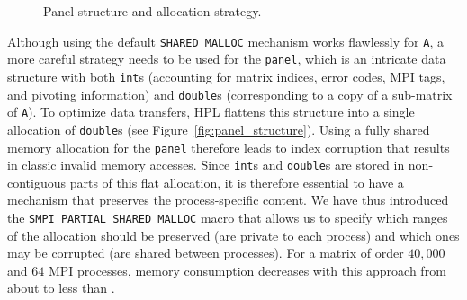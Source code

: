 \begin{figure}[htbp]
{\begin{minipage}{1.0\linewidth}
{\begin{minipage}[b]{\linewidth}
                \end{minipage}%
            }%
            \end{minipage}}%
            \caption{Panel structure and allocation strategy.\label{fig:panel}}\vspace{-1em}
        \end{figure}

        Although using the default \texttt{SHARED\_MALLOC} mechanism works flawlessly for \texttt{A}, a more careful
        strategy needs to be used for the \texttt{panel}, which is an intricate data structure with both \texttt{int}s
        (accounting for matrix indices, error codes, MPI tags, and pivoting information) and \texttt{double}s
        (corresponding to a copy of a sub-matrix of \texttt{A}). To optimize data transfers, HPL flattens this structure
        into a single allocation of \texttt{double}s (see Figure~\ref{fig:panel_structure}). Using a fully shared memory
        allocation for the \texttt{panel} therefore leads to index corruption that results in classic invalid memory
        accesses. Since \texttt{int}s and \texttt{double}s are stored in non-contiguous parts of this flat allocation,
        it is therefore essential to have a mechanism that preserves the process-specific content. We have thus
        introduced the \texttt{SMPI\_PARTIAL\_SHARED\_MALLOC} macro that allows us to specify which ranges of the
        allocation should be preserved (\ie are private to each process) and which ones may be corrupted (\ie are shared
        between processes).  For a matrix of order \(40,000\) and \(64\) MPI processes, memory consumption decreases
        with this approach from about  to less than .

